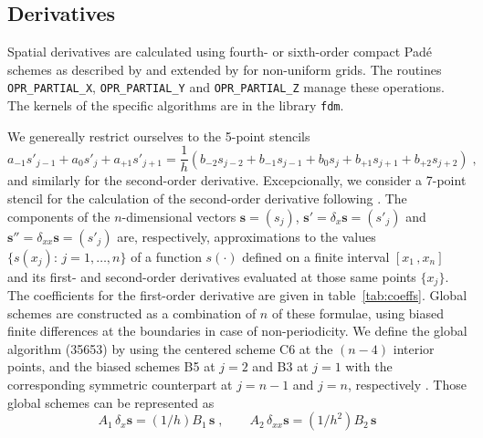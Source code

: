\subsection{Derivatives}\label{sec:fdm}

Spatial derivatives are calculated using fourth- or sixth-order compact Pad\'{e} schemes as described by \cite{Lele:1992} and extended by \cite{Shukla:2005} for non-uniform grids. The routines {\tt OPR\_PARTIAL\_X}, {\tt OPR\_PARTIAL\_Y} and {\tt OPR\_PARTIAL\_Z} manage these operations. The kernels of the specific algorithms are in the library {\tt fdm}.

We genereally restrict ourselves to the 5-point stencils
\begin{equation}
a_{-1}s'_{j-1}+a_{0}s'_{j}+a_{+1}s'_{j+1}=
\frac{1}{h}(b_{-2}s_{j-2}+b_{-1}s_{j-1}+b_{0}s_{j}+b_{+1}s_{j+1}+b_{+2}s_{j+2}) \;,
\label{equ:coefs}
\end{equation}
and similarly for the second-order derivative. Excepcionally, we consider a 7-point stencil for the calculation of the second-order derivative following \cite{Lamballais:2011}. The components of the $n$-dimensional vectors $\mathbf{s}=(s_j)$, $\mathbf{s'}=\delta_x \mathbf{s}=(s'_j)$ and $\mathbf{s''}=\delta_{xx} \mathbf{s}=(s'_j)$ are, respectively, approximations to the values $\{s(x_j):\, j=1,\ldots,n\}$ of a function $s(\cdot)$ defined on a finite interval $[x_1\,,x_n]$ and its first- and second-order derivatives evaluated at those same points $\{x_j\}$. The coefficients for the first-order derivative are given in table~\ref{tab:coeffs}. Global schemes are constructed as a combination of $n$ of these formulae, using biased finite differences at the boundaries in case of non-periodicity.  We define the global algorithm (35653) by using the centered scheme C6 at the $(n-4)$ interior points, and the biased schemes B5 at $j=2$ and B3 at $j=1$ with the corresponding symmetric counterpart at $j=n-1$ and $j=n$, respectively \cite{Carpenter:1993}. Those global schemes can be represented as
\begin{equation}
  A_1\, \delta_x \mathbf{s}=(1/h)B_1\, \mathbf{s} \;, \qquad
  A_2\, \delta_{xx} \mathbf{s}=(1/h^2)B_2\, \mathbf{s}
\label{equ:fdm}
\end{equation}
